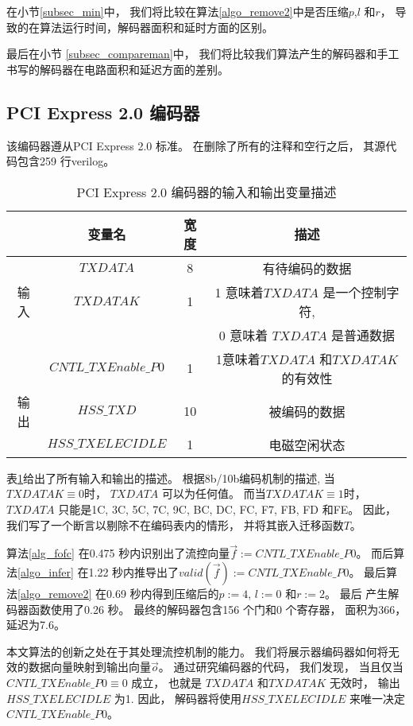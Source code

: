 在小节\ref{subsec_min}中，
我们将比较在算法\ref{algo_remove2}中是否压缩$p$,$l$ 和$r$，
导致的在算法运行时间，解码器面积和延时方面的区别。

最后在小节 \ref{subsec_compareman}中，
我们将比较我们算法产生的解码器和手工书写的解码器在电路面积和延迟方面的差别。


\subsection{PCI Express 2.0 编码器}\label{subsec_pcie2}
该编码器遵从PCI Express 2.0 标准。
在删除了所有的注释和空行之后，
其源代码包含259 行verilog。

\begin{table}[b]%
\caption{PCI Express 2.0 编码器的输入和输出变量描述}
\label{tab:pcieio}
\begin{tabular}{|c|c|c|c|}
\hline
         & 变量名               & 宽度  &描述\\\hline\hline
         & $TXDATA$             & 8     &有待编码的数据\\\cline{2-4}
输入     & $TXDATAK$            & 1     &1 意味着$TXDATA$ 是一个控制字符, \\
         &                      &       &0 意味着 $TXDATA$ 是普通数据\\\cline{2-4}
         & $CNTL\_TXEnable\_P0$ & 1     &1意味着$TXDATA$ 和$TXDATAK$的有效性\\\hline
输出     & $HSS\_TXD$           & 10    &被编码的数据\\\cline{2-4}
         & $HSS\_TXELECIDLE$    & 1     &电磁空闲状态\\\hline
\end{tabular}
\end{table}%

表\ref{tab:pcieio}给出了所有输入和输出的描述。
根据8b/10b编码机制的描述,
当 $TXDATAK\equiv 0$时，
$TXDATA$ 可以为任何值。
而当$TXDATAK\equiv 1$时，
$TXDATA$ 只能是1C, 3C, 5C, 7C, 9C, BC, DC, FC, F7, FB, FD 和FE。
因此，
我们写了一个断言以剔除不在编码表内的情形，
并将其嵌入迁移函数$T$。

算法\ref{alg_fofc} 在0.475 秒内识别出了流控向量$\vec{f}:=CNTL\_TXEnable\_P0$。
而后算法\ref{algo_infer} 在1.22 秒内推导出了$valid(\vec{f}):=CNTL\_TXEnable\_P0$。
最后算法\ref{algo_remove2} 在0.69 秒内得到压缩后的$p:=4$, $l:=0$ 和$r:=2$。
最后
产生解码器函数使用了0.26 秒。
最终的解码器包含156 个门和0 个寄存器，
面积为366，
延迟为7.6。


本文算法的创新之处在于其处理流控机制的能力。
我们将展示器编码器如何将无效的数据向量映射到输出向量$\vec{o}$。
通过研究编码器的代码，
我们发现，
当且仅当$CNTL\_TXEnable\_P0\equiv 0$ 成立，
也就是
$TXDATA$ 和$TXDATAK$ 无效时，
输出$HSS\_TXELECIDLE$ 为1.
因此，
解码器将使用$HSS\_TXELECIDLE$ 来唯一决定$CNTL\_TXEnable\_P0$。

